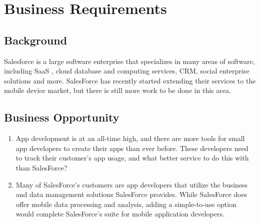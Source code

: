 \documentclass[12pt,oneside,letterpaper]{article}
\begin{document}
\newpage
\section{Business Requirements}
\subsection{Background}
Salesforce is a large software enterprise that specializes in many areas of software, including SaaS , cloud database and computing services, CRM, social enterprise solutions and more. SalesForce has recently started extending their services to the mobile device market, but there is still more work to be done in this area.

\subsection{Business Opportunity}
\begin{enumerate}[label = {\textbf{BOP-\arabic*}}, align = left, leftmargin = *, labelsep = 15pt]
\item App development is at an all-time high, and there are more tools for small app developers to create their apps than ever before. These developers need to track their customer's app usage, and what better service to do this with than SalesForce?
\item Many of SalesForce's customers are app developers that utilize the business and data management solutions SalesForce provides. While SalesForce does offer mobile data processing and analysis, adding a simple-to-use option would complete SalesForce's suite for mobile application developers.
\end{enumerate}
\end{document}
